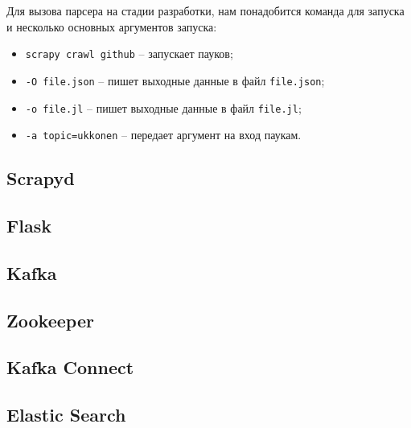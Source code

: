 Для вызова парсера на стадии разработки, нам понадобится команда для запуска и
несколько основных аргументов запуска:
\begin{itemize}
    \item \verb|scrapy crawl github| -- запускает пауков;
    \item \verb|-O file.json| -- пишет выходные данные в файл \verb|file.json|;
    \item \verb|-o file.jl| -- пишет выходные данные в файл \verb|file.jl|;
    \item \verb|-a topic=ukkonen| -- передает аргумент на вход паукам.
\end{itemize}

\subsection{Scrapyd}
\subsection{Flask}
\subsection{Kafka}
\subsection{Zookeeper}
\subsection{Kafka Connect}
\subsection{Elastic Search}
